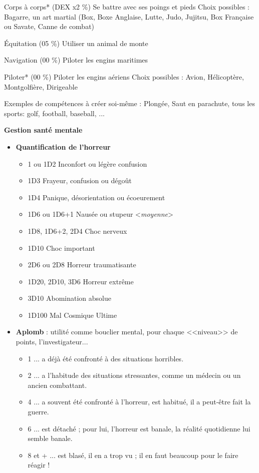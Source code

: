 \documentclass[11pt,twoside,a4paper]{article}
\begin{document}
\begin{multicols*}{2}
	Corps {\`a} corps* (DEX x2 \%)
	Se battre avec ses poings et pieds
	Choix possibles : Bagarre, un art martial (Box, Boxe Anglaise, Lutte, Judo, Jujitsu, Box Fran\c{c}aise ou Savate, Canne de combat)
	
	{\'E}quitation (05 \%)
	Utiliser un animal de monte
	
	Navigation (00 \%)
	Piloter les engins maritimes
	
	Piloter* (00 \%)
	Piloter les engins a{\'e}riens
	Choix possibles : Avion, H{\'e}licopt{\`e}re, Montgolfi{\`e}re, Dirigeable

	Exemples de comp{\'e}tences {\`a} cr{\'e}er soi-m{\^e}me : 
	Plong{\'e}e, Saut en parachute, tous les sports: golf, football, baseball, ...

\vfill
\columnbreak

\textbf{\large Gestion sant{\'e} mentale} %
\begin{itemize}
	\item[] \textbf{Quantification de l'horreur}
	\begin{itemize}
		\item[] 1 ou 1D2	Inconfort ou l{\'e}g{\`e}re confusion
		\item[] 1D3	Frayeur, confusion ou d{\'e}go{\^u}t
		\item[] 1D4	Panique, d{\'e}sorientation ou {\'e}coeurement
		\item[] 1D6 ou 1D6+1	Naus{\'e}e ou stupeur <\emph{moyenne}>
		\item[] 1D8, 1D6+2, 2D4	Choc nerveux
		\item[] 1D10	Choc important
		\item[] 2D6 ou 2D8	Horreur traumatisante
		\item[] 1D20, 2D10, 3D6	Horreur extr{\^e}me
		\item[] 3D10	Abomination absolue
		\item[] 1D100	Mal Cosmique Ultime
	\end{itemize}
	
	\item[] \textbf{Aplomb} : utilit{\'e} comme bouclier mental, pour chaque <<niveau>> de points, l'investigateur...
	\begin{itemize}
		\item[] 1	... a d{\'e}j{\`a} {\'e}t{\'e} confront{\'e} {\`a} des situations horribles. 
		\item[] 2	... a l'habitude des situations stressantes, comme un m{\'e}decin ou un ancien combattant. 
		\item[] 4	... a souvent {\'e}t{\'e} confront{\'e} {\`a} l'horreur, est habitu{\'e}, il a peut-{\^e}tre fait la guerre. 
		\item[] 6	... est d{\'e}tach{\'e} ; pour lui, l'horreur est banale, la r{\'e}alit{\'e} quotidienne lui semble banale. 
		\item[] 8 et +	... est blas{\'e}, il en a trop vu ; il en faut beaucoup pour le faire r{\'e}agir !
	\end{itemize}
	

\end{itemize}
\end{multicols*}
\end{document}
